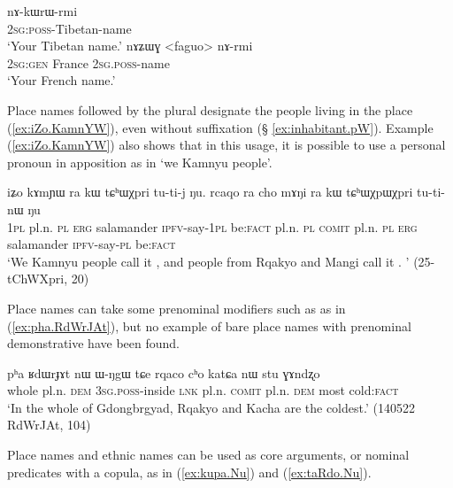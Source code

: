\begin{exe}
\ex \label{ex:nArmi}
\begin{xlist}
\ex  \label{ex:nAkWrWrmi}
\gll nɤ-kɯrɯ-rmi   \\
\textsc{2sg}:\textsc{poss}-Tibetan-name \\
\glt `Your Tibetan name.' 
\ex  \label{ex:faguo.nArmi}
\gll nɤʑɯɣ <faguo> nɤ-rmi   \\
\textsc{2sg}:\textsc{gen} France \textsc{2sg}.\textsc{poss}-name \\
\glt `Your French name.' 
\end{xlist}
\end{exe}
 
Place names followed by the plural  designate the people living in the place (\ref{ex:iZo.KamnYW}), even without  suffixation (§ \ref{ex:inhabitant.pW}). Example (\ref{ex:iZo.KamnYW}) also shows that in this usage, it is possible to use a personal pronoun in apposition as in   `we Kamnyu people'.

\begin{exe}
\ex \label{ex:iZo.KamnYW}
 \gll iʑo kɤmɲɯ ra kɯ tɕʰɯχpri tu-ti-j ŋu. rcaqo ra cho mɤŋi ra kɯ tɕʰɯχpɯχpri tu-ti-nɯ ŋu \\
 \textsc{1pl} pl.n. \textsc{pl} \textsc{erg} salamander \textsc{ipfv}-say-\textsc{1pl} be:\textsc{fact} pl.n. \textsc{pl} \textsc{comit} pl.n. \textsc{pl} \textsc{erg}  salamander \textsc{ipfv}-say-\textsc{pl} be:\textsc{fact} \\
 \glt `We Kamnyu people call it , and people from Rqakyo and Mangi call it . ' (25-tChWXpri, 20)
\end{exe}

Place names can take some prenominal modifiers such as  as in (\ref{ex:pha.RdWrJAt}), but no example of bare place names with prenominal demonstrative have been found. %

\begin{exe}
\ex \label{ex:pha.RdWrJAt}
 \gll pʰa ʁdɯrɟɤt nɯ ɯ-ŋgɯ tɕe rqaco cʰo katɕa nɯ stu ɣɤndʐo \\
 whole pl.n. \textsc{dem} \textsc{3sg}.\textsc{poss}-inside \textsc{lnk} pl.n. \textsc{comit} pl.n. \textsc{dem} most cold:\textsc{fact} \\
 \glt  `In the whole of Gdongbrgyad, Rqakyo and Kacha are the coldest.' (140522 RdWrJAt, 104)
\end{exe}

Place names and ethnic names can be used as core arguments, or nominal predicates with a copula, as in (\ref{ex:kupa.Nu}) and (\ref{ex:taRdo.Nu}).


